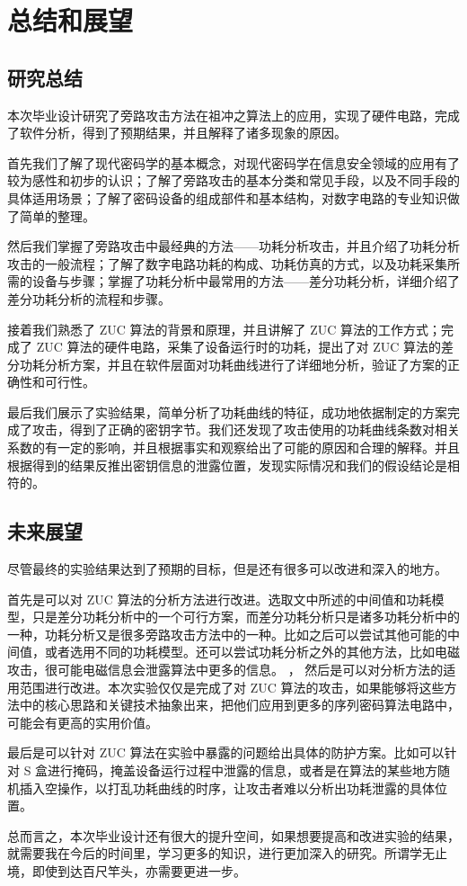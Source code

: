 
\chapter{总结和展望}

\label{chap:conclusion}

\section{研究总结}

本次毕业设计研究了旁路攻击方法在祖冲之算法上的应用，实现了硬件电路，完成了软件分析，得到了预期结果，并且解释了诸多现象的原因。


首先我们了解了现代密码学的基本概念，对现代密码学在信息安全领域的应用有了较为感性和初步的认识；了解了旁路攻击的基本分类和常见手段，以及不同手段的具体适用场景；了解了密码设备的组成部件和基本结构，对数字电路的专业知识做了简单的整理。

然后我们掌握了旁路攻击中最经典的方法——功耗分析攻击，并且介绍了功耗分析攻击的一般流程；了解了数字电路功耗的构成、功耗仿真的方式，以及功耗采集所需的设备与步骤；掌握了功耗分析中最常用的方法——差分功耗分析，详细介绍了差分功耗分析的流程和步骤。

接着我们熟悉了 ZUC 算法的背景和原理，并且讲解了 ZUC 算法的工作方式；完成了 ZUC 算法的硬件电路，采集了设备运行时的功耗，提出了对 ZUC 算法的差分功耗分析方案，并且在软件层面对功耗曲线进行了详细地分析，验证了方案的正确性和可行性。

最后我们展示了实验结果，简单分析了功耗曲线的特征，成功地依据制定的方案完成了攻击，得到了正确的密钥字节。我们还发现了攻击使用的功耗曲线条数对相关系数的有一定的影响，并且根据事实和观察给出了可能的原因和合理的解释。并且根据得到的结果反推出密钥信息的泄露位置，发现实际情况和我们的假设结论是相符的。

\section{未来展望}

尽管最终的实验结果达到了预期的目标，但是还有很多可以改进和深入的地方。

首先是可以对 ZUC 算法的分析方法进行改进。选取文中所述的中间值和功耗模型，只是差分功耗分析中的一个可行方案，而差分功耗分析只是诸多功耗分析中的一种，功耗分析又是很多旁路攻击方法中的一种。比如之后可以尝试其他可能的中间值，或者选用不同的功耗模型。还可以尝试功耗分析之外的其他方法，比如电磁攻击，很可能电磁信息会泄露算法中更多的信息。
，
然后是可以对分析方法的适用范围进行改进。本次实验仅仅是完成了对 ZUC 算法的攻击，如果能够将这些方法中的核心思路和关键技术抽象出来，把他们应用到更多的序列密码算法电路中，可能会有更高的实用价值。

最后是可以针对 ZUC 算法在实验中暴露的问题给出具体的防护方案。比如可以针对 S 盒进行掩码，掩盖设备运行过程中泄露的信息，或者是在算法的某些地方随机插入空操作，以打乱功耗曲线的时序，让攻击者难以分析出功耗泄露的具体位置。

总而言之，本次毕业设计还有很大的提升空间，如果想要提高和改进实验的结果，就需要我在今后的时间里，学习更多的知识，进行更加深入的研究。所谓学无止境，即使到达百尺竿头，亦需要更进一步。
